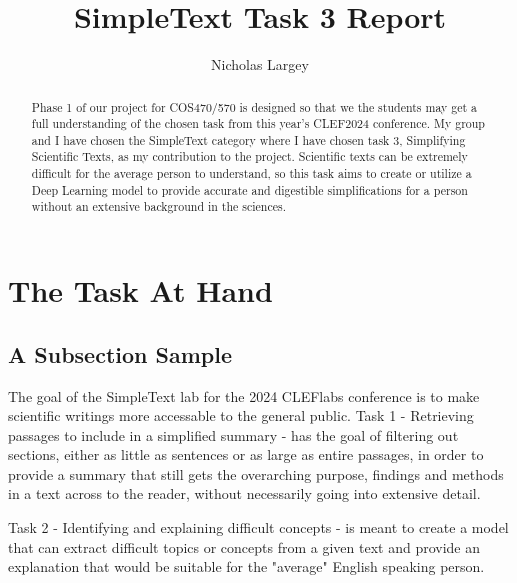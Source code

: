 \documentclass[runningheads]{llncs}
\begin{document}
%
\title{SimpleText Task 3 Report}
%
%
\author{Nicholas Largey}
%
%

%
\maketitle              %
%
\begin{abstract}
Phase 1 of our project for COS470/570 is designed so that we the students may get a 
full understanding of the chosen task from this year's CLEF2024 conference. My group and I
have chosen the SimpleText category where I have chosen task 3, Simplifying Scientific Texts, 
as my contribution to the project. Scientific texts can be extremely difficult for the average
person to understand, so this task aims to create or utilize a Deep Learning model to provide 
accurate and digestible simplifications for a person without an extensive background in the
sciences.
\end{abstract}
%
%
%
\section{The Task At Hand}
\subsection{A Subsection Sample}
The goal of the SimpleText lab for the 2024 CLEFlabs conference is to make scientific writings 
more accessable to the general public. Task 1 - Retrieving passages to include in a simplified summary - has the goal of filtering out sections, either as little as sentences or as large as entire passages, in order to provide a summary that still gets the overarching purpose, findings and methods in a text across to the reader, without necessarily going into extensive detail. 

Task 2 - Identifying and explaining difficult concepts - is meant to create a model that can extract difficult topics or concepts from a given text and provide an explanation that would be suitable for the "average" English speaking person. 
\end{document}
